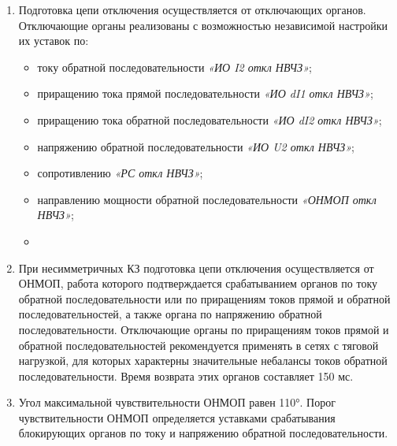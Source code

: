\begin{enumerate}[label=\arabic{section}.\arabic{subsection}.\arabic{enumi}, labelsep=4pt, leftmargin=0pt, itemindent=57pt, itemsep=0pt, parsep=5pt]
\begin{enumerate}[label=\arabic{section}.\arabic{subsection}.\arabic{enumi}.\arabic*, labelsep=4pt, leftmargin=0em, itemindent=65pt, parsep=0pt]
\item
Подготовка цепи отключения осуществляется от отключающих органов.
Отключающие органы реализованы с возможностью независимой настройки их уставок по:
\begin{itemize} 
\item току обратной последовательности \textit{«ИО I2 откл НВЧЗ»};
\item приращению тока прямой последовательности \textit{«ИО dI1 откл НВЧЗ»};
\item приращению тока обратной последовательности \textit{«ИО dI2 откл НВЧЗ»};
\item напряжению обратной последовательности \textit{«ИО U2 откл НВЧЗ»};
\item сопротивлению \textit{«РС откл НВЧЗ»};
\item направлению мощности обратной последовательности \textit{«ОНМОП откл НВЧЗ»};
\item {}
\end{itemize}

\item
При несимметричных КЗ подготовка цепи отключения осуществляется от ОНМОП, работа которого подтверждается срабатыванием органов по току обратной последовательности или по приращениям токов прямой и обратной последовательностей, а также органа по напряжению обратной последовательности.
Отключающие органы по приращениям токов прямой и обратной последовательностей рекомендуется применять в сетях с тяговой нагрузкой, для которых характерны значительные небалансы токов обратной последовательности.
Время возврата этих органов составляет 150 мс.

\item
Угол максимальной чувствительности ОНМОП равен 110°.
Порог чувствительности ОНМОП определяется уставками срабатывания блокирующих органов по току и напряжению обратной последовательности.


\end{enumerate}
\end{enumerate}
